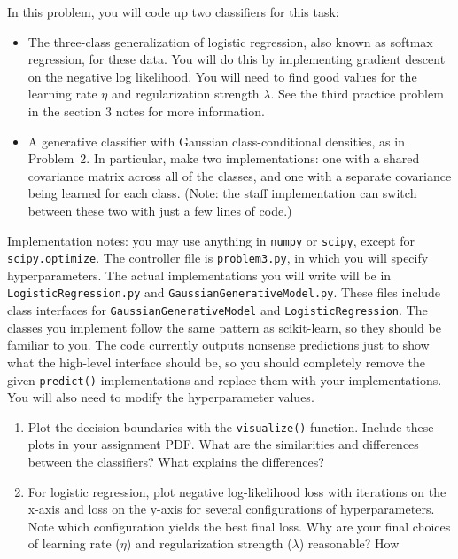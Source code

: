 \documentclass[submit]{harvardml}
\begin{document}
\begin{problem}
In this problem, you will code up two classifiers for this task:
\begin{itemize}
\item The three-class generalization of logistic regression, also
  known as softmax regression, for these data. You will do this by
  implementing gradient descent on the negative log likelihood. You
  will need to find good values for the learning rate $\eta$ and
  regularization strength $\lambda$. See the third practice problem in
  the section 3 notes for more information.

\item A generative classifier with Gaussian class-conditional
  densities, as in Problem~2. In particular, make two implementations:
  one with a shared covariance matrix across all of the classes, and
  one with a separate covariance being learned for each class.  (Note:
  the staff implementation can switch between these two with just a
  few lines of code.)
\end{itemize}
Implementation notes: you may use anything in \texttt{numpy} or
\texttt{scipy}, except for \texttt{scipy.optimize}.  The controller
file is \texttt{problem3.py}, in which you will specify
hyperparameters. The actual implementations you will write will be in
\texttt{LogisticRegression.py} and
\texttt{GaussianGenerativeModel.py}.  These files include class
interfaces for \texttt{GaussianGenerativeModel} and
\texttt{LogisticRegression}. The classes you implement follow the same pattern
as scikit-learn, so they should be familiar to you.  The code
currently outputs nonsense predictions just to show what the
high-level interface should be, so you should completely remove the
given \texttt{predict()} implementations and replace them with your
implementations.  You will also need to modify the hyperparameter
values.
\begin{enumerate}
\item Plot the decision boundaries with the \texttt{visualize()}
  function. Include these plots in your assignment PDF. What are the similarities and differences between the
  classifiers?  What explains the differences?
\item For logistic regression, plot negative log-likelihood loss with
  iterations on the x-axis and loss on the y-axis for several
  configurations of hyperparameters. Note which configuration yields
  the best final loss. Why are your final choices of learning rate
  ($\eta$) and regularization strength ($\lambda$) reasonable? How

\end{enumerate}
\end{problem}
\end{document}
